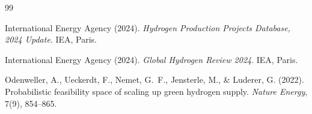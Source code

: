 \begin{thebibliography}{99}

International Energy Agency (2024).
\newblock \textit{Hydrogen Production Projects Database, 2024 Update}.
\newblock IEA, Paris.

International Energy Agency (2024).
\newblock \textit{Global Hydrogen Review 2024}.
\newblock IEA, Paris.

Odenweller, A., Ueckerdt, F., Nemet, G.~F., Jensterle, M., \& Luderer, G. (2022).
\newblock Probabilistic feasibility space of scaling up green hydrogen supply.
\newblock \textit{Nature Energy}, 7(9), 854--865.

\end{thebibliography}

